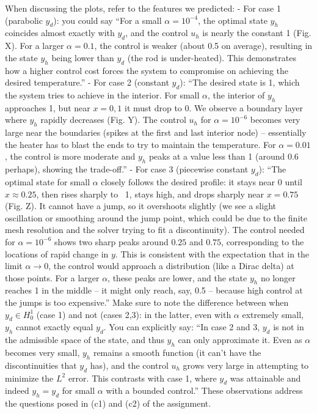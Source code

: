 \documentclass[a4paper,10pt]{report}
\begin{document}
When discussing the plots, refer to the features we predicted:
- For case 1 (parabolic \(y_d\)): you could say “For a small \(\alpha=10^{-4}\), the optimal state \(y_h\) coincides almost exactly with \(y_d\), and the control \(u_h\) is nearly the constant 1 (Fig. X). For a larger \(\alpha=0.1\), the control is weaker (about 0.5 on average), resulting in the state \(y_h\) being lower than \(y_d\) (the rod is under-heated). This demonstrates how a higher control cost forces the system to compromise on achieving the desired temperature.”
- For case 2 (constant \(y_d\)): “The desired state is 1, which the system tries to achieve in the interior. For small \(\alpha\), the interior of \(y_h\) approaches 1, but near \(x=0,1\) it must drop to 0. We observe a boundary layer where \(y_h\) rapidly decreases (Fig. Y). The control \(u_h\) for \(\alpha=10^{-6}\) becomes very large near the boundaries (spikes at the first and last interior node) – essentially the heater has to blast the ends to try to maintain the temperature. For \(\alpha=0.01\), the control is more moderate and \(y_h\) peaks at a value less than 1 (around 0.6 perhaps), showing the trade-off.”
- For case 3 (piecewise constant \(y_d\)): “The optimal state for small \(\alpha\) closely follows the desired profile: it stays near 0 until \(x\approx0.25\), then rises sharply to ~1, stays high, and drops sharply near \(x=0.75\) (Fig. Z). It cannot have a jump, so it overshoots slightly (we see a slight oscillation or smoothing around the jump point, which could be due to the finite mesh resolution and the solver trying to fit a discontinuity). The control needed for \(\alpha=10^{-6}\) shows two sharp peaks around \(0.25\) and \(0.75\), corresponding to the locations of rapid change in \(y\). This is consistent with the expectation that in the limit \(\alpha \to 0\), the control would approach a distribution (like a Dirac delta) at those points. For a larger \(\alpha\), these peaks are lower, and the state \(y_h\) no longer reaches 1 in the middle – it might only reach, say, 0.5 – because high control at the jumps is too expensive.” Make sure to note the difference between when \(y_d \in H^1_0\) (case 1) and not (cases 2,3): in the latter, even with \(\alpha\) extremely small, \(y_h\) cannot exactly equal \(y_d\). You can explicitly say: “In case 2 and 3, \(y_d\) is not in the admissible space of the state, and thus \(y_h\) can only approximate it. Even as \(\alpha\) becomes very small, \(y_h\) remains a smooth function (it can't have the discontinuities that \(y_d\) has), and the control \(u_h\) grows very large in attempting to minimize the \(L^2\) error. This contrasts with case 1, where \(y_d\) was attainable and indeed \(y_h = y_d\) for small \(\alpha\) with a bounded control.” These observations address the questions posed in (c1) and (c2) of the assignment.
\end{document}
